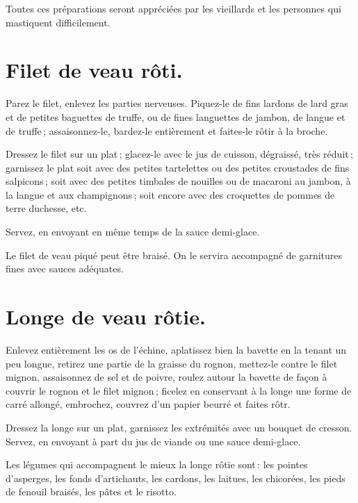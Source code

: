 \sk

Toutes ces préparations seront appréciées par les vieillards et les personnes qui
mastiquent difficilement.

\section*{\centering Filet de veau rôti.}
{}

Parez le filet, enlevez les parties nerveuses. Piquez-le de fins lardons de
lard gras et de petites baguettes de truffe, ou de fines languettes de jambon,
de langue et de truffe ; assaisonnez-le, bardez-le entièrement et faites-le
rôtir à la broche.

Dressez le filet sur un plat ; glacez-le avec le jus de cuisson, dégraissé,
très réduit ; garnissez le plat soit avec des petites tartelettes ou des
petites croustades de fins salpicons ; soit avec des petites timbales de
nouilles ou de macaroni au jambon, à la langue et aux champignons ; soit encore
avec des croquettes de pommes de terre duchesse, etc.

Servez, en envoyant en même temps de la sauce demi-glace.

\sk

Le filet de veau piqué peut être braisé. On le servira accompagné de garnitures
fines avec sauces adéquates.

\section*{\centering Longe de veau rôtie.}
{}

Enlevez entièrement les os de l'échine, aplatissez bien la bavette en la tenant
un peu longue, retirez une partie de la graisse du rognon, mettez-le contre le
filet mignon, assaisonnez de sel et de poivre, roulez autour la bavette de
façon à couvrir le rognon et le filet mignon ; ficelez en conservant à la longe
une forme de carré allongé, embrochez, couvrez d'un papier beurré et faites
rôtr.

Dressez la longe sur un plat, garnissez les extrémités avec un bouquet de
cresson. Servez, en envoyant à part du jus de viande ou une sauce demi-glace.

Les légumes qui accompagnent le mieux la longe rôtie sont : les pointes
d’asperges, les fonds d’artichauts, les cardons, les laitues, les chicorées,
les pieds de fenouil braisés, les pâtes et le risotto.


